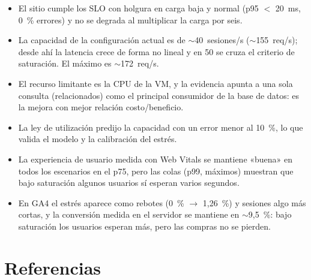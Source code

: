 \documentclass[11pt,a4paper]{article}
\begin{document}
\begin{itemize}
  \item El sitio cumple los SLO con holgura en carga baja y normal (p95 $<$
        20~ms, 0~\% errores) y no se degrada al multiplicar la carga por seis.
  \item La capacidad de la configuración actual es de $\sim$40~sesiones/s
        ($\sim$155~req/s); desde ahí la latencia crece de forma no lineal y en 50
        se cruza el criterio de saturación. El máximo es $\sim$172~req/s.
  \item El recurso limitante es la CPU de la VM, y la evidencia apunta a una sola
        consulta (relacionados) como el principal consumidor de la base de
        datos: es la mejora con mejor relación costo/beneficio.
  \item La ley de utilización predijo la capacidad con un error menor al 10~\%,
        lo que valida el modelo y la calibración del estrés.
  \item La experiencia de usuario medida con Web Vitals se mantiene «buena» en
        todos los escenarios en el p75, pero las colas (p99, máximos) muestran
        que bajo saturación algunos usuarios sí esperan varios segundos.
  \item En GA4 el estrés aparece como rebotes (0~\% $\rightarrow$ 1,26~\%) y
        sesiones algo más cortas, y la conversión medida en el servidor se
        mantiene en $\sim$9,5~\%: bajo saturación los usuarios esperan más,
        pero las compras no se pierden.
\end{itemize}

\section*{Referencias}
\end{document}

